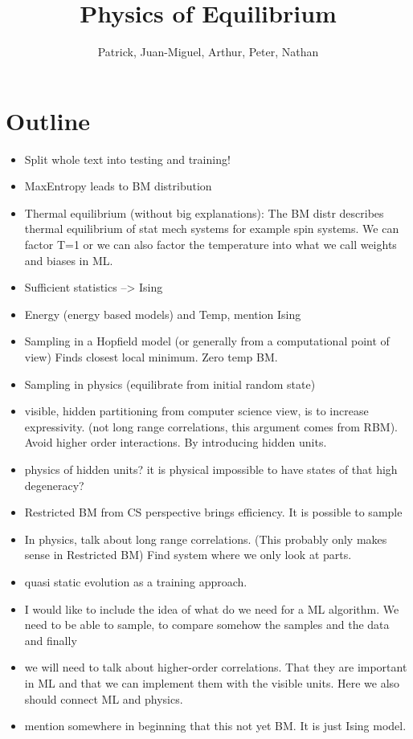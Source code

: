 \documentclass[nofootinbib, superscriptaddress, prl]{revtex4}
\begin{document}
\title{Physics of Equilibrium}
\author{Patrick, Juan-Miguel, Arthur, Peter, Nathan}
\maketitle

\section{Outline}

\begin{itemize}
\item Split whole text into testing and training!
\item MaxEntropy leads to BM distribution
\item Thermal equilibrium (without big explanations): The BM distr describes thermal equilibrium of stat mech systems for example spin systems.
We can factor T=1 or we can also factor the temperature into what we call weights and biases in ML.
\item Sufficient statistics --> Ising
\item Energy (energy based models) and Temp, mention Ising
\item Sampling in a Hopfield model (or generally from a computational point of view) Finds closest local minimum. Zero temp BM.
\item Sampling in physics (equilibrate from initial random state)
\item visible, hidden partitioning from computer science view, is to increase expressivity.
(not long range correlations, this argument comes from RBM). Avoid higher order interactions. By introducing hidden units.
\item physics of hidden units? it is physical impossible to have states of that high degeneracy?
\item Restricted BM from CS perspective brings efficiency. It is possible to sample
\item In physics, talk about long range correlations. (This probably only makes sense in Restricted BM)
Find system where we only look at parts.
\item quasi static evolution as a training approach.
\item I would like to include the idea of what do we need for a ML algorithm. We need to be able to sample, to compare somehow the samples and the data and finally 
\item we will need to talk about higher-order correlations. That they are important in ML and that we can implement them with the visible units. Here we also should connect ML and physics.
\item mention somewhere in beginning that this not yet BM. It is just Ising model.
\end{itemize}
\end{document}
